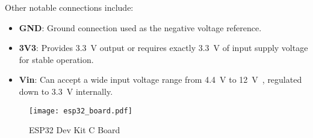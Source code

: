 Other notable connections include:
\begin{itemize}
	\item \textbf{GND}: Ground connection used as the negative voltage reference.
	\item \textbf{3V3}: Provides \num{3.3}~\si{\volt} output or requires exactly \num{3.3}~\si{\volt} of input supply voltage for stable operation.
	\item \textbf{Vin}: Can accept a wide input voltage range from \num{4.4}~\si{\volt} to \num{12}~\si{\volt}~\cite{amicu.}, regulated down to \num{3.3}~\si{\volt} internally.
\end{itemize}

\begin{figure}[h]
	\centering
	\captionsetup{justification=centering}
	\texttt{[image: esp32\_board.pdf]}
	\caption{ESP32 Dev Kit C Board}
	\label{fig:microprocessor_esp32}
\end{figure}

